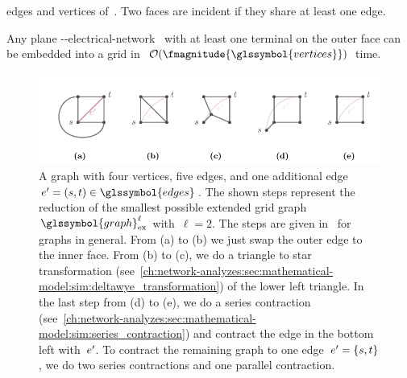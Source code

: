 edges and vertices of~. Two faces are incident if they share at
least one edge.
% 
\begin{lemma}
    Any plane \source-\sink-electrical-network~ with at least
    one terminal on the outer face can be embedded into a grid
    in~$\bigO(\fmagnitude{\glssymbol{vertices}})$ time.
    \label{ch:network-analyzes:sec:mathematical-model:lemma:embedding-into-a grid}
\end{lemma}
% 
\begin{figure}[t!]
    \includegraphics{networkAnalyzes/figures/Delta-Wye-Reducibility-Case-1.pdf}
    \caption[The delta-wye-reducibility of the smallest extended grid graph.]{A
    graph with four vertices, five edges, and one additional edge~$\edge' =
    (\source,\sink) \in \glssymbol{edges}$. The shown steps represent the
    reduction of the smallest possible extended grid
    graph~$\glssymbol{graph}_{\mathrm{ex}}^\ell$ with~$\ell = 2$. The steps are
    given in~\textcite{Tru89} for graphs in general. From (a) to (b) we just
    swap the outer edge to the inner face. From (b) to (c), we do a triangle to
    star transformation
    (see~\cref{ch:network-analyzes:sec:mathematical-model:sim:deltawye_transformation})
    of the lower left triangle. In the last step from (d) to (e), we do a series
    contraction
    (see~\cref{ch:network-analyzes:sec:mathematical-model:sim:series_contraction})
    and contract the edge in the bottom left with~$e'$. To contract the
    remaining graph to one edge~$e'=\{s,t\}$, we do two series
    contractions and one parallel contraction.
    }
    \label{ch:network-analyzes:sec:mathematical-model:fig:delta-wye-reducibility-case-1}
\end{figure}
% 
